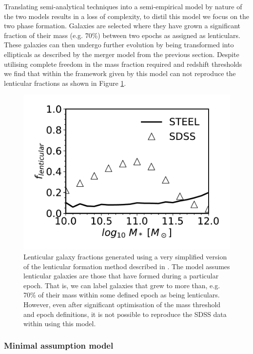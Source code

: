 Translating semi-analytical techniques into a semi-empirical model by nature of the two models results in a loss of complexity, to distil this model we focus on the two phase formation. Galaxies are selected where they have grown a significant fraction of their mass (e.g. 70\%) between two epochs as assigned as lenticulars. These galaxies can then undergo further evolution by being transformed into ellipticals as described by the merger model from the previous section. Despite utilising complete freedom in the mass fraction required and redshift thresholds we find that within the framework given by \steel this model can not reproduce the lenticular fractions as shown in Figure \ref{fig:CookeModel}.

\begin{figure}
  \includegraphics[width=\linewidth]{Figures/Chapter5/CookModel.pdf}
    \caption{Lenticular galaxy fractions generated using a very simplified
      version of the lenticular formation method described in
      \cite{Cook2009Two-phaseFormation}. The model assumes lenticular galaxies are those that have formed during a particular epoch. That is, we can label galaxies that grew to more than, e.g. 70\% of their mass within some defined epoch as being
      lenticulars. However, even after significant optimisation of the mass
      threshold and epoch definitions, it is not possible to reproduce the SDSS
      data within \steel using this model.}
    \label{fig:CookeModel}
\end{figure}

\subsubsection{Minimal assumption model}

